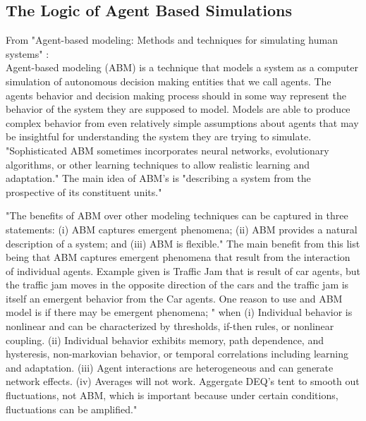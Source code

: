 \documentclass[12pt,twoside]{reedthesis}
\begin{document}
\subsection{The Logic of Agent Based Simulations}

From "Agent-based modeling: Methods and techniques for simulating human systems" \cite{Bonabeau2002}: \\

Agent-based modeling (ABM) is a technique that models a system as a computer simulation of autonomous decision making entities that we call agents. The agents behavior and decision making process should in some way represent the behavior of the system they are supposed to model. Models are able to produce complex behavior from even relatively simple assumptions about agents that may be insightful for understanding the system they are trying to simulate. "Sophisticated ABM sometimes incorporates neural networks, evolutionary algorithms, or other learning techniques to allow realistic learning and adaptation." The main idea of ABM's is "describing a system from the prospective of its constituent units." 

"The benefits of ABM over other modeling techniques can be captured in three statements: (i)  ABM captures emergent phenomena; (ii) ABM provides a natural description of a system; and (iii) ABM is flexible." The main benefit from this list being that ABM captures emergent phenomena that result from the interaction of individual agents. Example given is Traffic Jam that is result of car agents, but the traffic jam moves in the opposite direction of the cars and the traffic jam is itself an emergent behavior from the Car agents. One reason to use and ABM model is if there may be emergent phenomena; " when (i) Individual behavior is nonlinear and can be characterized by thresholds, if-then rules, or nonlinear coupling. (ii) Individual behavior exhibits memory, path dependence, and hysteresis, non-markovian behavior, or temporal correlations including learning and adaptation. (iii) Agent interactions are heterogeneous and can generate network effects. (iv) Averages will not work. Aggergate DEQ's tent to smooth out fluctuations, not ABM, which is important because under certain conditions, fluctuations can be amplified."
\end{document}
